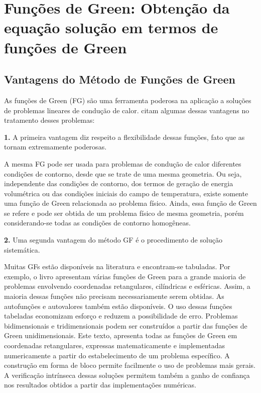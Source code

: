 \chapter[Funções de Green]{Funções de Green: Obtenção da equação solução em termos de funções de Green}\label{FG}

\section{Vantagens do Método de Funções de Green}
As funções de Green (FG) são uma ferramenta poderosa na aplicação a soluções de problemas lineares de condução de calor. \textcite{beck2010} citam algumas dessas vantagens no tratamento desses problemas:

\textbf{1.} A primeira vantagem diz respeito a flexibilidade dessas funções, fato que as tornam extremamente poderosas.

A mesma FG pode ser usada para problemas de condução de calor diferentes condições de contorno, desde que se trate de uma mesma geometria. Ou seja, independente das condições de contorno, dos termos de geração de energia volumétrica ou das condições iniciais do campo de temperatura, existe somente uma função de Green relacionada ao problema físico. Ainda, essa função de Green se refere e pode ser obtida de um problema físico de mesma geometria, porém considerando-se todas as condições de contorno homogêneas.

\textbf{2.} Uma segunda vantagem do método GF é o procedimento de solução sistemática.

Muitas GFs estão disponíveis na literatura e encontram-se tabuladas. Por exemplo, o livro  \textcite{beck1993} apresentam várias funções de Green para a grande maioria de problemas envolvendo coordenadas retangulares, cilíndricas e esféricas. Assim, a maioria dessas funções não precisam necessariamente serem obtidas. As autofunções e autovalores também estão disponíveis. O uso dessas funções tabeladas economizam esforço e reduzem a possibilidade de erro. Problemas bidimensionais e tridimensionais podem ser construídos a partir das funções de Green unidimensionais. Este texto, apresenta todas as funções de Green em coordenadas retangulares, expressas matematicamente e implementadas numericamente a partir do estabelecimento de um problema específico. A construção em forma de bloco permite facilmente o uso de problemas mais gerais. A verificação intrínseca dessas soluções permitem também a ganho de confiança nos resultados obtidos a partir das implementações numéricas.

